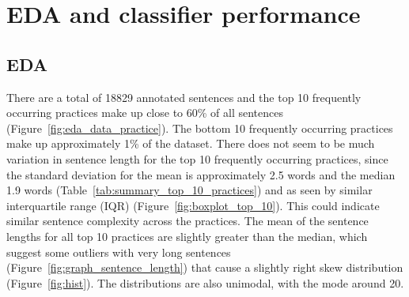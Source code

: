 
\chapter{EDA and classifier performance} %

\label{chapter3} %

\section{EDA}
There are a total of 18829 annotated sentences and the top 10 frequently occurring practices make up close to 60\% of all sentences (Figure~\ref{fig:eda_data_practice}). The bottom 10 frequently occurring practices make up approximately 1\% of the dataset. There does not seem to be much variation in sentence length for the top 10 frequently occurring practices, since the standard deviation for the mean is approximately 2.5 words and the median 1.9 words (Table~\ref{tab:summary_top_10_practices}) and as seen by similar interquartile range (IQR) (Figure~\ref{fig:boxplot_top_10}). This could indicate similar sentence complexity across the practices. The mean of the sentence lengths for all top 10 practices are slightly greater than the median, which suggest some outliers with very long sentences (Figure~\ref{fig:graph_sentence_length}) that cause a slightly right skew distribution (Figure~\ref{fig:hist}). The distributions are also unimodal, with the mode around 20.


